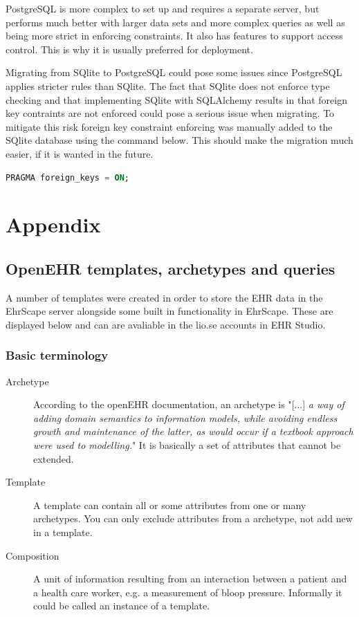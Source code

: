 \documentclass{article}
\begin{document}
PostgreSQL is more complex to set up and requires a separate server, but performs much better with larger data sets and more complex queries as well as being more strict in enforcing constraints. It also has features to support access control. This is why it is usually preferred for deployment. 

Migrating from SQlite to PostgreSQL could pose some issues since PostgreSQL applies stricter rules than SQlite. The fact that SQlite does not enforce type checking and that implementing SQlite with SQLAlchemy results in that foreign key contraints are not enforced could pose a serious issue when migrating. To mitigate this risk foreign key constraint enforcing was manually added to the SQlite database using the command below. This should make the migration much easier, if it is wanted in the future.

\begin{lstlisting}[language = SQL]
PRAGMA foreign_keys = ON;
\end{lstlisting}








\clearpage
\section{Appendix}
\subsection{OpenEHR templates, archetypes and queries}\label{ehr-appendix}
A number of templates were created in order to store the EHR data in the EhrScape server alongside some built in functionality in EhrScape. These are displayed below and can are avaliable in the lio.se accounts in EHR Studio.

\subsubsection{Basic terminology}
\begin{description}
\item[Archetype] According to the openEHR documentation, an archetype is "[...] \emph{a way of adding domain semantics to information models, while avoiding endless growth and maintenance of the latter, as would occur if a textbook approach were used to modelling.}" It is basically a set of attributes that cannot be extended.
\item[Template] A template can contain all or some attributes from one or many archetypes. You can only exclude attributes from a archetype, not add new in a template.
\item[Composition] A unit of information resulting from an interaction between a patient and a health care worker, e.g. a measurement of bloop pressure. Informally it could be called an instance of a template.
\end{description}
\end{document}
